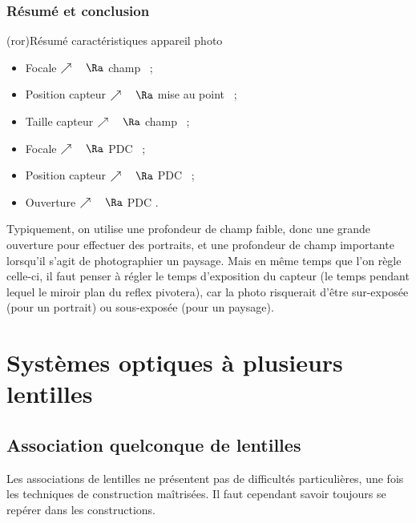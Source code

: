 \documentclass[../../main/main.tex]{subfiles}
\begin{document}
\subsubsection{Résumé et conclusion}
\begin{tcb*}[label=ror:app_phot,
		list entry={\lte\theror~: Résumé carac.\ appareil photo}
	](ror){Résumé caractéristiques appareil photo}
	\begin{minipage}{0.50\linewidth}
		\begin{itemize}[label=$\diamond$, leftmargin=10pt]
			\item Focale $\nearrow\quad\Ra$ champ \psw{$\searrow$}~;
			\item Position capteur $\nearrow\quad\Ra$ mise au point
			      \psw{$\searrow$}~;
			\item Taille capteur $\nearrow\quad\Ra$ champ \psw{$\nearrow$}~;
		\end{itemize}
	\end{minipage}
	\begin{minipage}{0.50\linewidth}
		\begin{itemize}[label=$\diamond$, leftmargin=10pt]
			\item Focale $\nearrow\quad\Ra$ PDC \psw{$\searrow$}~;
			\item Position capteur $\nearrow\quad\Ra$ PDC \psw{$\searrow$}~;
			\item Ouverture $\nearrow\quad\Ra$ PDC \psw{$\searrow$}.
		\end{itemize}
	\end{minipage}
\end{tcb*}

Typiquement, on utilise une profondeur de champ faible, donc une grande
ouverture pour effectuer des portraits, et une profondeur de champ importante
lorsqu'il s'agit de photographier un paysage.\newline
Mais en même temps que l'on règle celle-ci, il faut penser à régler le temps
d'exposition du capteur (le temps pendant lequel le miroir plan du reflex
pivotera), car la photo risquerait d'être sur-exposée (pour un portrait) ou
sous-exposée (pour un paysage).

\section{Systèmes optiques à plusieurs lentilles}

\subsection{Association quelconque de lentilles}
Les associations de lentilles ne présentent pas de difficultés particulières,
une fois les techniques de construction maîtrisées. Il faut cependant savoir
toujours se repérer dans les constructions.
\end{document}
